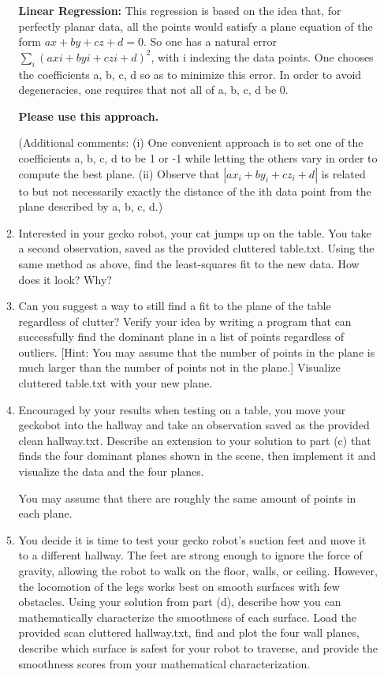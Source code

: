 \documentclass[conference,onecolumn]{IEEEtran}
\begin{document}
\begin{enumerate}[label=\arabic{enumi}.]
\begin{enumerate}
                    \textbf{Linear Regression:} This regression is based on the idea that, for perfectly planar data, all the points would satisfy a plane equation of the form $ax + by + cz + d = 0$.
                    So one has a natural error $\sum_i (axi + byi + czi + d)^2$, with i indexing the data points.
                    One chooses the coefficients {a, b, c, d} so as to minimize this error.
                    In order to avoid degeneracies, one requires that not all of {a, b, c, d} be 0.

                    \textbf{Please use this approach.}

                    (Additional comments: (i) One convenient approach is to set one of the coefficients {a, b, c, d} to be 1 or -1 while letting the others vary in order to compute the best plane.
                    (ii) Observe that $|ax_i + by_i + cz_i + d|$ is related to but not necessarily exactly the distance of the ith data point from the plane described by {a, b, c, d}.)
              \item Interested in your gecko robot, your cat jumps up on the table.
                    You take a second observation, saved as the provided cluttered table.txt.
                    Using the same method as above, find the least-squares fit to the new data.
                    How does it look? Why?
              \item Can you suggest a way to still find a fit to the plane of the table regardless of clutter?
                    Verify your idea by writing a program that can successfully find the dominant plane in a list of points regardless of outliers.
                        [Hint: You may assume that the number of points in the plane is much larger than the number of points not in the plane.]
                    Visualize cluttered table.txt with your new plane.
              \item Encouraged by your results when testing on a table, you move your geckobot into the hallway and take an observation saved as the provided clean hallway.txt.
                    Describe an extension to your solution to part (c) that finds the four dominant planes shown in the scene, then implement it and visualize the data and the four planes.

                    You may assume that there are roughly the same amount of points in each plane.
              \item You decide it is time to test your gecko robot's suction feet and move it to a different hallway.
                    The feet are strong enough to ignore the force of gravity, allowing the robot to walk on the floor, walls, or ceiling.
                    However, the locomotion of the legs works best on smooth surfaces with few obstacles.
                    Using your solution from part (d), describe how you can mathematically characterize the smoothness of each surface.
                    Load the provided scan cluttered hallway.txt, find and plot the four wall planes, describe which surface is safest for your robot to traverse, and provide the smoothness scores from your mathematical characterization.


\end{enumerate}
\end{enumerate}
\end{document}

